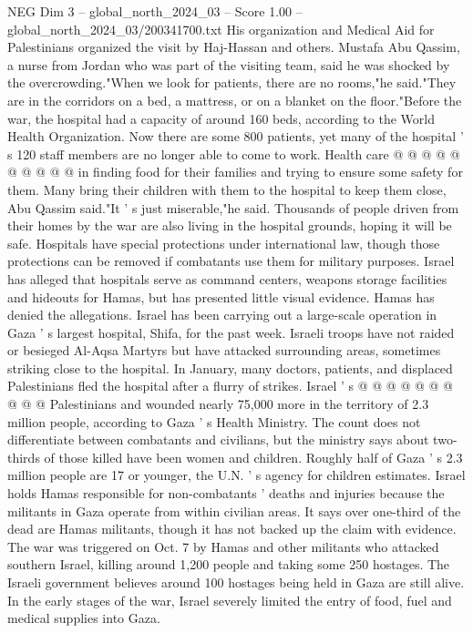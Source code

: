 \begin{textsample}{NEG Dim 3 – global\_north\_2024\_03 – Score 1.00 – global\_north\_2024\_03/200341700.txt}
His organization and Medical Aid for Palestinians organized the visit by Haj-Hassan and others.
Mustafa Abu Qassim, a nurse from Jordan who was part of the visiting team, said he was shocked by the overcrowding."When we look for patients, there are no rooms,"he said."They are in the corridors on a bed, a mattress, or on a blanket on the floor."Before the war, the hospital had a capacity of around 160 beds, according to the World Health Organization.
Now there are some 800 patients, yet many of the hospital ' s 120 staff members are no longer able to come to work.
Health care @ @ @ @ @ @ @ @ @ @ in finding food for their families and trying to ensure some safety for them.
Many bring their children with them to the hospital to keep them close, Abu Qassim said."It ' s just miserable,"he said.
Thousands of people driven from their homes by the war are also living in the hospital grounds, hoping it will be safe.
Hospitals have special protections under international law, though those protections can be removed if combatants use them for military purposes.
Israel has alleged that hospitals serve as command centers, weapons storage facilities and hideouts for Hamas, but has presented little visual evidence.
Hamas has denied the allegations.
Israel has been carrying out a large-scale operation in Gaza ' s largest hospital, Shifa, for the past week.
Israeli troops have not raided or besieged Al-Aqsa Martyrs but have attacked surrounding areas, sometimes striking close to the hospital.
In January, many doctors, patients, and displaced Palestinians fled the hospital after a flurry of strikes.
Israel ' s @ @ @ @ @ @ @ @ @ @ Palestinians and wounded nearly 75,000 more in the territory of 2.3 million people, according to Gaza ' s Health Ministry.
The count does not differentiate between combatants and civilians, but the ministry says about two-thirds of those killed have been women and children.
Roughly half of Gaza ' s 2.3 million people are 17 or younger, the U.N. ' s agency for children estimates.
Israel holds Hamas responsible for non-combatants ' deaths and injuries because the militants in Gaza operate from within civilian areas.
It says over one-third of the dead are Hamas militants, though it has not backed up the claim with evidence.
The war was triggered on Oct. 7 by Hamas and other militants who attacked southern Israel, killing around 1,200 people and taking some 250 hostages.
The Israeli government believes around 100 hostages being held in Gaza are still alive.
In the early stages of the war, Israel severely limited the entry of food, fuel and medical supplies into Gaza.

\end{textsample}
